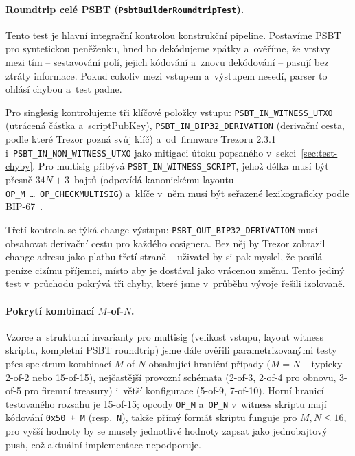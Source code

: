 \paragraph{Roundtrip celé PSBT
(\texttt{PsbtBuilderRoundtripTest}).}
Tento test je hlavní integrační kontrolou konstrukční pipeline.
Postavíme PSBT pro syntetickou peněženku, hned ho dekódujeme zpátky
a~ověříme, že vrstvy mezi tím -- sestavování polí, jejich kódování
a~znovu dekódování -- pasují bez ztráty informace. Pokud cokoliv
mezi vstupem a~výstupem nesedí, parser to ohlásí chybou a~test padne.

Pro singlesig kontrolujeme tři klíčové položky vstupu:
\texttt{PSBT\_\allowbreak IN\_\allowbreak WITNESS\_\allowbreak UTXO}
(utrácená částka a~scriptPubKey),
\texttt{PSBT\_\allowbreak IN\_\allowbreak BIP32\_\allowbreak DERIVATION}
(derivační cesta, podle které Trezor pozná svůj klíč) a~od~firmware
Trezoru 2.3.1 i~\texttt{PSBT\_\allowbreak IN\_\allowbreak NON\_\allowbreak WITNESS\_\allowbreak UTXO}
jako mitigaci útoku popsaného v~sekci~\ref{sec:test-chyby}. Pro multisig
přibývá \texttt{PSBT\_\allowbreak IN\_\allowbreak WITNESS\_\allowbreak SCRIPT},
jehož délka musí být přesně $34N+3$~bajtů (odpovídá kanonickému
layoutu \texttt{OP\_M~\ldots~OP\_CHECKMULTISIG}) a~klíče v~něm musí
být seřazené lexikograficky podle BIP-67~\cite{BIP67}.

Třetí kontrola se týká change výstupu:
\texttt{PSBT\_\allowbreak OUT\_\allowbreak BIP32\_\allowbreak DERIVATION}
musí obsahovat derivační cestu pro každého cosignera. Bez něj by Trezor
zobrazil change adresu jako platbu třetí straně -- uživatel by si pak
myslel, že posílá peníze cizímu příjemci, místo aby je dostával jako
vrácenou změnu. Tento jediný test v~průchodu pokrývá tři chyby, které
jsme v~průběhu vývoje řešili izolovaně.

\paragraph{Pokrytí kombinací $M$-of-$N$.}
Vzorce a~strukturní invarianty pro multisig (velikost vstupu, layout
witness skriptu, kompletní PSBT roundtrip) jsme dále ověřili
parametrizovanými testy přes spektrum kombinací $M$-of-$N$ obsahující
hraniční případy ($M=N$ -- typicky 2-of-2 nebo 15-of-15), nejčastější
provozní schémata (2-of-3, 2-of-4 pro obnovu, 3-of-5 pro firemní
treasury) i~větší konfigurace (5-of-9, 7-of-10). Horní hranicí
testovaného rozsahu je 15-of-15; opcody \texttt{OP\_M} a~\texttt{OP\_N}
v~witness skriptu mají kódování \texttt{0x50 + M} (resp.~\texttt{N}),
takže přímý formát skriptu funguje pro $M, N \leq 16$, pro vyšší
hodnoty by se musely jednotlivé hodnoty zapsat jako jednobajtový
push, což aktuální implementace nepodporuje.

